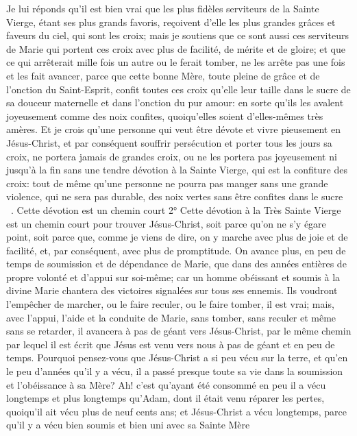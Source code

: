  Je lui réponds qu'il est bien vrai que les plus fidèles serviteurs de la Sainte Vierge, étant ses plus grands
favoris, reçoivent d'elle les plus grandes grâces et faveurs du ciel, qui sont les croix; mais je soutiens que ce sont
aussi ces serviteurs de Marie qui portent ces croix avec plus de facilité, de mérite et de gloire; et que ce qui
arrêterait mille fois un autre ou le ferait tomber, ne les arrête pas une fois et les fait avancer, parce que cette bonne
Mère, toute pleine de grâce et de l'onction du Saint-Esprit, confit toutes ces croix qu'elle leur taille dans le sucre de
sa douceur maternelle et dans l'onction du pur amour: en sorte qu'ils les avalent joyeusement comme des noix
confites, quoiqu'elles soient d'elles-mêmes très amères. Et je crois qu'une personne qui veut être dévote et vivre
pieusement en Jésus-Christ, et par conséquent souffrir persécution et porter tous les jours sa croix, ne portera
jamais de grandes croix, ou ne les portera pas joyeusement ni jusqu'à la fin sans une tendre dévotion à la Sainte
Vierge, qui est la confiture des croix: tout de même qu'une personne ne pourra pas manger sans une grande
violence, qui ne sera pas durable, des noix vertes sans être confites dans le sucre ~.
Cette dévotion est un chemin court
 2° Cette dévotion à la Très Sainte Vierge est un chemin court pour trouver Jésus-Christ, soit parce qu'on ne
s'y égare point, soit parce que, comme je viens de dire, on y marche avec plus de joie et de facilité, et, par
conséquent, avec plus de promptitude. On avance plus, en peu de temps de soumission et de dépendance de
Marie, que dans des années entières de propre volonté et d'appui sur soi-même; car un homme obéissant et
soumis à la divine Marie chantera des victoires signalées sur tous ses ennemis. Ils voudront l'empêcher de
marcher, ou le faire reculer, ou le faire tomber, il est vrai; mais, avec l'appui, l'aide et la conduite de Marie, sans
tomber, sans reculer et même sans se retarder, il avancera à pas de géant vers Jésus-Christ, par le même chemin
par lequel il est écrit que Jésus est venu vers nous à pas de géant et en peu de temps.
 Pourquoi pensez-vous que Jésus-Christ a si peu vécu sur la terre, et qu'en le peu d'années qu'il y a vécu, il a
passé presque toute sa vie dans la soumission et l'obéissance à sa Mère? Ah! c'est qu'ayant été consommé en
peu il a vécu longtemps et plus longtemps qu'Adam, dont il était venu réparer les pertes, quoiqu'il ait vécu plus de
neuf cents ans; et Jésus-Christ a vécu longtemps, parce qu'il y a vécu bien soumis et bien uni avec sa Sainte Mère
